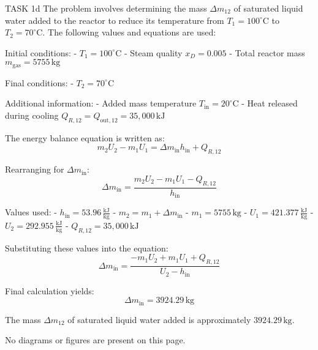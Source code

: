 TASK 1d  
The problem involves determining the mass \( \Delta m_{12} \) of saturated liquid water added to the reactor to reduce its temperature from \( T_1 = 100^\circ\text{C} \) to \( T_2 = 70^\circ\text{C} \). The following values and equations are used:

Initial conditions:  
- \( T_1 = 100^\circ\text{C} \)  
- Steam quality \( x_D = 0.005 \)  
- Total reactor mass \( m_{\text{gas}} = 5755 \, \text{kg} \)  

Final conditions:  
- \( T_2 = 70^\circ\text{C} \)  

Additional information:  
- Added mass temperature \( T_{\text{in}} = 20^\circ\text{C} \)  
- Heat released during cooling \( Q_{R,12} = Q_{\text{out},12} = 35,000 \, \text{kJ} \)  

The energy balance equation is written as:  
\[
m_2 U_2 - m_1 U_1 = \Delta m_{\text{in}} h_{\text{in}} + Q_{R,12}
\]  

Rearranging for \( \Delta m_{\text{in}} \):  
\[
\Delta m_{\text{in}} = \frac{m_2 U_2 - m_1 U_1 - Q_{R,12}}{h_{\text{in}}}
\]  

Values used:  
- \( h_{\text{in}} = 53.96 \, \frac{\text{kJ}}{\text{kg}} \)  
- \( m_2 = m_1 + \Delta m_{\text{in}} \)  
- \( m_1 = 5755 \, \text{kg} \)  
- \( U_1 = 421.377 \, \frac{\text{kJ}}{\text{kg}} \)  
- \( U_2 = 292.955 \, \frac{\text{kJ}}{\text{kg}} \)  
- \( Q_{R,12} = 35,000 \, \text{kJ} \)  

Substituting these values into the equation:  
\[
\Delta m_{\text{in}} = \frac{-m_1 U_2 + m_1 U_1 + Q_{R,12}}{U_2 - h_{\text{in}}}
\]  

Final calculation yields:  
\[
\Delta m_{\text{in}} = 3924.29 \, \text{kg}
\]  

The mass \( \Delta m_{12} \) of saturated liquid water added is approximately \( 3924.29 \, \text{kg} \).  

No diagrams or figures are present on this page.